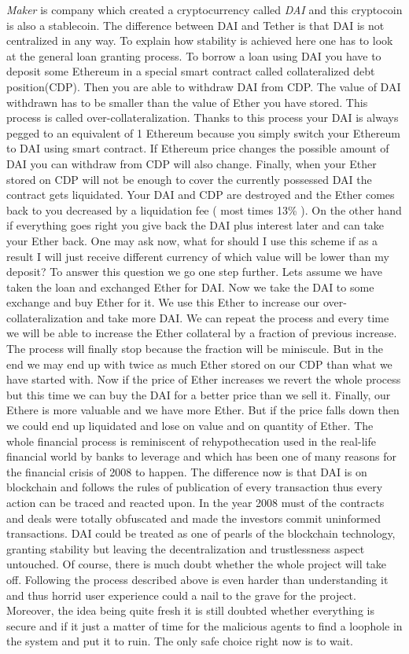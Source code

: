 \documentclass[a4paper,12pt,twoside,openany]{report}
\begin{document}
\textit{Maker} is company which created a cryptocurrency called \textit{DAI} \cite{makerdao} and this cryptocoin is also a stablecoin. The difference between DAI and Tether is that DAI is not centralized in any way. To explain how stability is achieved here one has to look at the general loan granting process. To borrow a loan using DAI you have to deposit some Ethereum in a special smart contract called collateralized debt position(CDP). Then you are able to withdraw DAI from CDP. The value of DAI withdrawn has to be smaller than the value of Ether you have stored. This process is called over-collateralization. Thanks to this process your DAI is always pegged to an equivalent of 1 Ethereum because you simply switch your Ethereum to DAI using smart contract. If Ethereum price changes the possible amount of DAI you can withdraw from CDP will also change. Finally, when your Ether stored on CDP will not be enough to cover the currently possessed DAI the contract gets liquidated. Your DAI and CDP are destroyed and the Ether comes back to you decreased by a liquidation fee ( most times 13\% ). On the other hand if everything goes right you give back the DAI plus interest later and can take your Ether back. One may ask now, what for should I use this scheme if as a result I will just receive different currency of which value will be lower than my deposit? To answer this question we go one step further. Lets assume we have taken the loan and exchanged Ether for DAI. Now we take the DAI to some exchange and buy Ether for it. We use this Ether to increase our over-collateralization and take more DAI. We can repeat the process and every time we will be able to increase the Ether collateral by a fraction of previous increase. The process will finally stop because the fraction will be miniscule. But in the end we may end up with twice as much Ether stored on our CDP than what we have started with. Now if the price of Ether increases we revert the whole process but this time we can buy the DAI for a better price than we sell it. Finally, our Ethere is more valuable and we have more Ether. But if the price falls down then we could end up liquidated and lose on value and on quantity of Ether. The whole financial process is reminiscent of rehypothecation used in the real-life financial world by banks to leverage and which has been one of many reasons for the financial crisis of 2008 to happen. The difference now is that DAI is on blockchain and follows the rules of publication of every transaction thus every action can be traced and reacted upon. In the year 2008 must of the contracts and deals were totally obfuscated and made the investors commit uninformed transactions. DAI could be treated as one of pearls of the blockchain technology, granting stability but leaving the decentralization and trustlessness aspect untouched. Of course, there is much doubt whether the whole project will take off. Following the process described above is even harder than understanding it and thus horrid user experience could a nail to the grave for the project. Moreover, the idea being quite fresh it is still doubted whether everything is secure and if it just a matter of time for the malicious agents to find a loophole in the system and put it to ruin. The only safe choice right now is to wait.
\end{document}
